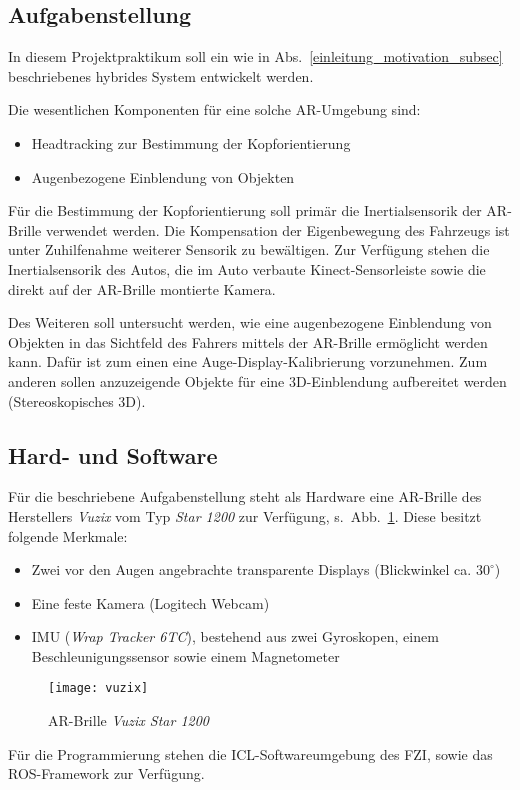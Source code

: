 \subsection{Aufgabenstellung}
\label{einleitung_aufgabenstellung_subsec}


In diesem Projektpraktikum soll ein wie in Abs.~\ref{einleitung_motivation_subsec} beschriebenes hybrides System entwickelt werden.

Die wesentlichen Komponenten für eine solche \ac{AR}-Umgebung sind:
\begin{itemize}
  \item Headtracking zur Bestimmung der Kopforientierung
  \item Augenbezogene Einblendung von Objekten
\end{itemize}

Für die Bestimmung der Kopforientierung soll primär die Inertialsensorik der \ac{AR}-Brille verwendet werden.
Die Kompensation der Eigenbewegung des Fahrzeugs ist unter Zuhilfenahme weiterer Sensorik zu bewältigen.
Zur Verfügung stehen die Inertialsensorik des Autos, die im Auto verbaute Kinect-Sensorleiste sowie die direkt auf der \ac{AR}-Brille montierte Kamera.

Des Weiteren soll untersucht werden, wie eine augenbezogene Einblendung von Objekten in das Sichtfeld des Fahrers mittels der \ac{AR}-Brille ermöglicht werden kann.
Dafür ist zum einen eine Auge-Display-Kalibrierung vorzunehmen.
Zum anderen sollen anzuzeigende Objekte für eine 3D-Einblendung aufbereitet werden (Stereoskopisches 3D).


\subsection{Hard- und Software}
\label{einleitung_hardware_subsec}

Für die beschriebene Aufgabenstellung steht als Hardware eine \ac{AR}-Brille des Herstellers \emph{Vuzix} vom Typ \emph{Star 1200} zur Verfügung, s.~Abb.~\ref{fig:vuzix_star_1200}.
Diese besitzt folgende Merkmale:
\begin{itemize}
  \item Zwei vor den Augen angebrachte transparente Displays (Blickwinkel ca. $30^\circ$)
  \item Eine feste Kamera (Logitech Webcam)
  \item \ac{IMU} (\emph{Wrap Tracker 6TC}), bestehend aus zwei Gyroskopen, einem Beschleunigungssensor sowie einem Magnetometer
\end{itemize}

\begin{figure}[h]
  \centering
  \texttt{[image: vuzix]}
  \caption{\ac{AR}-Brille \emph{Vuzix Star 1200}\ \cite{vuzix}}
  \label{fig:vuzix_star_1200}
\end{figure}

Für die Programmierung stehen die \ac{ICL}-Softwareumgebung des \ac{FZI}, sowie das \ac{ROS}-Framework \cite{ros} zur Verfügung.
